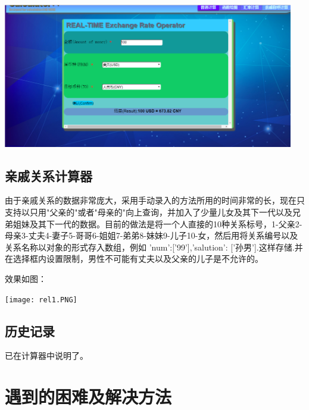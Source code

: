 \documentclass[hyperref,UTF8]{ctexart}
\begin{document}
\begin{center}
\includegraphics[width=5in]{rate.PNG}
\end{center}

\subsection{亲戚关系计算器}
由于亲戚关系的数据非常庞大，采用手动录入的方法所用的时间非常的长，现在只支持以只用"父亲的"或者"母亲的"向上查询，并加入了少量儿女及其下一代以及兄弟姐妹及其下一代的数据。目前的做法是将一个人直接的10种关系标号，1-父亲2-母亲3-丈夫4-妻子5-哥哥6-姐姐7-弟弟8-妹妹9-儿子10-女，然后用将关系编号以及关系名称以对象的形式存入数组，例如 'num':['99'],'salution': ['孙男'].这样存储.并在选择框内设置限制，男性不可能有丈夫以及父亲的儿子是不允许的。

效果如图：

\begin{center}
\texttt{[image: rel1.PNG]}
\end{center}

\subsection{历史记录}
已在计算器中说明了。


\newpage

\section{遇到的困难及解决方法}
\end{document}
